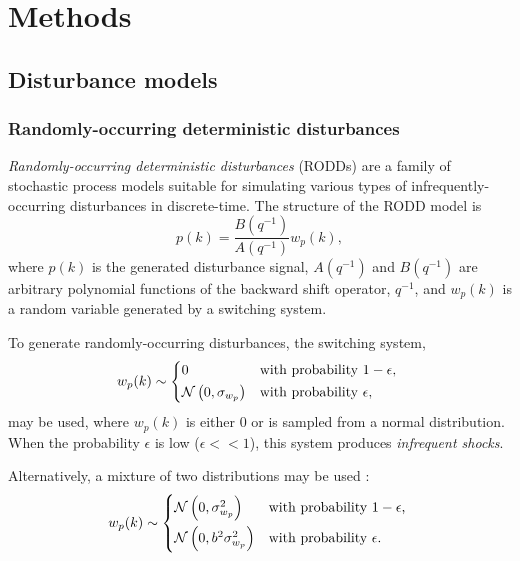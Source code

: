 \chapter{Methods}
\label{chap-methods}


\section{Disturbance models}

\subsection{Randomly-occurring deterministic disturbances}\label{subsec-RODD}

\textit{Randomly-occurring deterministic disturbances} (RODDs) \citep{macgregor_duality_1984} are a family of stochastic process models suitable for simulating various types of infrequently-occurring disturbances in discrete-time.  The structure of the RODD model is
\begin{equation} \label{eq:RODD}
	p(k)= \frac{B(q^{-1})}{A(q^{-1})}w_p(k),
\end{equation}
where $p(k)$ is the generated disturbance signal, $A(q^{-1})$ and $B(q^{-1})$ are arbitrary polynomial functions of the backward shift operator, $q^{-1}$, and $w_p(k)$ is a random variable generated by a switching system.

To generate randomly-occurring disturbances, the switching system,
\begin{equation} \label{eq:wpk1}
w_p(k) \sim 
\begin{cases*}
	0 & with probability $1-\epsilon$, \\
	\mathcal{N}\left(0, \sigma_{w_p}\right) & with probability $\epsilon$,
\end{cases*}
\end{equation}
may be used, where $w_p(k)$ is either 0 or is sampled from a normal distribution.  When the probability $\epsilon$ is low ($\epsilon<<1$), this system produces \textit{infrequent shocks}.

Alternatively, a mixture of two distributions may be used \citep{robertson_detection_1995}:
\begin{equation} \label{eq:wpk2}
w_p(k) \sim 
	\begin{cases*}
		\mathcal{N}\left(0, \sigma_{w_p}^2\right) & with probability $1-\epsilon$, \\
		\mathcal{N}\left(0, b^2\sigma_{w_p}^2\right) & with probability $\epsilon$.
	\end{cases*}
\end{equation}

